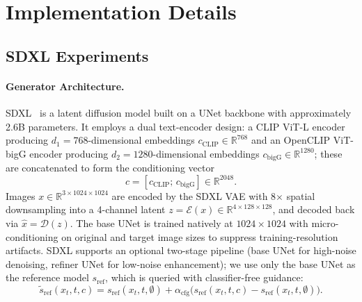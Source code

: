 \section{Implementation Details}
\label{app:implementation}

\subsection{SDXL Experiments}

\paragraph{Generator Architecture.}
SDXL~\citep{podell2023sdxl} is a latent diffusion model built on a UNet backbone with approximately 2.6B parameters. It employs a dual text-encoder design: a CLIP ViT-L encoder producing $d_1=768$-dimensional embeddings $c_{\mathrm{CLIP}}\in\mathbb{R}^{768}$ and an OpenCLIP ViT-bigG encoder producing $d_2=1280$-dimensional embeddings $c_{\mathrm{bigG}}\in\mathbb{R}^{1280}$; these are concatenated to form the conditioning vector
\begin{equation}
c = [c_{\mathrm{CLIP}};\,c_{\mathrm{bigG}}] \in \mathbb{R}^{2048}.
\end{equation}
Images $x\in\mathbb{R}^{3\times1024\times1024}$ are encoded by the SDXL VAE with 8$\times$ spatial downsampling into a 4-channel latent $z=\mathcal{E}(x)\in\mathbb{R}^{4\times128\times128}$, and decoded back via $\hat{x}=\mathcal{D}(z)$. The base UNet is trained natively at $1024\times1024$ with micro-conditioning on original and target image sizes to suppress training-resolution artifacts. SDXL supports an optional two-stage pipeline (base UNet for high-noise denoising, refiner UNet for low-noise enhancement); we use only the base UNet as the reference model $s_{\mathrm{ref}}$, which is queried with classifier-free guidance:
\begin{equation}
\tilde{s}_{\mathrm{ref}}(x_t,t,c) = s_{\mathrm{ref}}(x_t,t,\emptyset) + \alpha_{\mathrm{cfg}}\bigl(s_{\mathrm{ref}}(x_t,t,c)-s_{\mathrm{ref}}(x_t,t,\emptyset)\bigr).
\end{equation}

